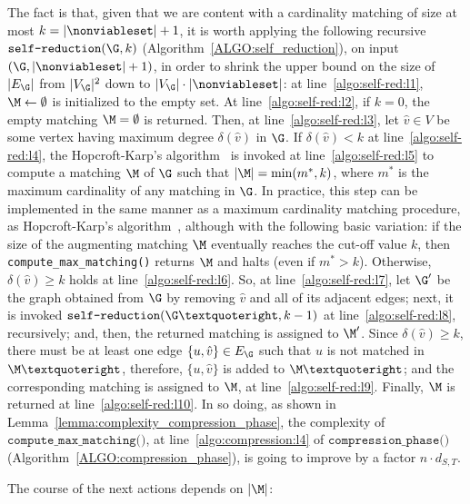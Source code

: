 The fact is that, given that we are content with a cardinality matching of size at most $k = |\nonviableset| + 1$,
it is worth applying the following recursive $\texttt{self-reduction}(\G,k)$ (Algorithm~\ref{ALGO:self_reduction}),
on input $(\G, |\nonviableset|+1)$, in order to shrink the upper bound on the size of $|E_\G|$ from $|V_\G|^2$ down to $|V_\G|\cdot |\nonviableset|$:
at line~\ref{algo:self-red:l1}, $\M\leftarrow\emptyset$ is initialized to the empty set. At line~\ref{algo:self-red:l2}, if $k=0$, the empty matching $\M=\emptyset$ is returned.
Then, at line~\ref{algo:self-red:l3}, let $\hat{v}\in V$ be some vertex having maximum degree $\delta(\hat{v})$ in $\G$.
If $\delta(\hat{v})<k$ at line~\ref{algo:self-red:l4}, the Hopcroft-Karp's algorithm~\cite{HK73} is invoked at line~\ref{algo:self-red:l5}
to compute a matching $\M$ of $\G$ such that $|\M| = \min(m^*, k)$, where $m^*$ is the maximum cardinality of any matching in $\G$.
In practice, this step can be implemented in the same manner as a maximum cardinality matching procedure,
\eg as Hopcroft-Karp's algorithm~\cite{HK73}, although with the following basic variation:
if the size of the augmenting matching $\M$ eventually reaches the cut-off value $k$,
then \texttt{compute\_max\_matching()}
returns $\M$ and halts (\ie even if $m^* > k$).
Otherwise, $\delta(\hat{v})\geq k$ holds at line~\ref{algo:self-red:l6}. So, at line~\ref{algo:self-red:l7},
let $\G'$ be the graph obtained from $\G$ by removing $\hat{v}$ and all of its adjacent edges;
next, it is invoked $\texttt{self-reduction}(\G’, k-1)$ at line~\ref{algo:self-red:l8}, recursively; and, then, the returned matching is assigned to $\M'$.
Since $\delta(\hat{v})\geq k$, there must be at least one edge $\{u,\hat{v}\}\in E_\G$ such that $u$ is not matched in $\M’$,
therefore, $\{u,\hat{v}\}$ is added to $\M’$; and the corresponding matching is assigned to $\M$, at line~\ref{algo:self-red:l9}.
Finally, $\M$ is returned at line~\ref{algo:self-red:l10}. In so doing, as shown in Lemma~\ref{lemma:complexity_compression_phase},
the complexity of $\texttt{compute\_max\_matching()}$, at line~\ref{algo:compression:l4} of $\texttt{compression\_phase()}$ (Algorithm~\ref{ALGO:compression_phase}),
is going to improve by a factor $n\cdot d_{S,T}$.

The course of the next actions depends on
$|\M|$:

